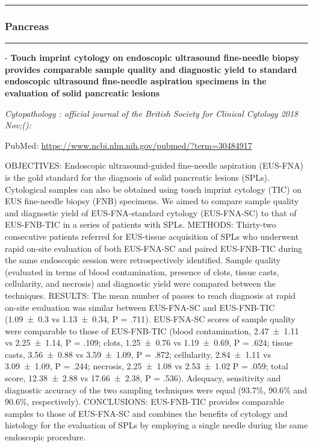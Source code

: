 \documentclass[]{article}
\begin{document}
\begin{center}\rule{0.5\linewidth}{\linethickness}\end{center}

\hypertarget{pancreas-1}{%
\subsubsection{Pancreas}\label{pancreas-1}}

\begin{center}\rule{0.5\linewidth}{\linethickness}\end{center}

 - \textbf{Touch imprint cytology on endoscopic ultrasound fine-needle
biopsy provides comparable sample quality and diagnostic yield to
standard endoscopic ultrasound fine-needle aspiration specimens in the
evaluation of solid pancreatic lesions}

\emph{Cytopathology : official journal of the British Society for
Clinical Cytology 2018 Nov;():}

PubMed: \url{https://www.ncbi.nlm.nih.gov/pubmed/?term=30484917}

OBJECTIVES: Endoscopic ultrasound-guided fine-needle aspiration
(EUS-FNA) is the gold standard for the diagnosis of solid pancreatic
lesions (SPLs). Cytological samples can also be obtained using touch
imprint cytology (TIC) on EUS fine-needle biopsy (FNB) specimens. We
aimed to compare sample quality and diagnostic yield of EUS-FNA-standard
cytology (EUS-FNA-SC) to that of EUS-FNB-TIC in a series of patients
with SPLs. METHODS: Thirty-two consecutive patients referred for
EUS-tissue acquisition of SPLs who underwent rapid on-site evaluation of
both EUS-FNA-SC and paired EUS-FNB-TIC during the same endoscopic
session were retrospectively identified. Sample quality (evaluated in
terms of blood contamination, presence of clots, tissue casts,
cellularity, and necrosis) and diagnostic yield were compared between
the techniques. RESULTS: The mean number of passes to reach diagnosis at
rapid on-site evaluation was similar between EUS-FNA-SC and EUS-FNB-TIC
(1.09~±~0.3 vs 1.13~±~0.34, P = .711). EUS-FNA-SC scores of sample
quality were comparable to those of EUS-FNB-TIC (blood contamination,
2.47~±~1.11 vs 2.25~±~1.14, P = .109; clots, 1.25~±~0.76 vs 1.19~±~0.69,
P = .624; tissue casts, 3.56~±~0.88 vs 3.59~±~1.09, P = .872;
cellularity, 2.84~±~1.11 vs 3.09~±~1.09, P = .244; necrosis, 2.25~±~1.08
vs 2.53~±~1.02 P = .059; total score, 12.38~±~2.88 vs 17.66~±~2.38, P =
.536). Adequacy, sensitivity and diagnostic accuracy of the two sampling
techniques were equal (93.7\%, 90.6\% and 90.6\%, respectively).
CONCLUSIONS: EUS-FNB-TIC provides comparable samples to those of
EUS-FNA-SC and combines the benefits of cytology and histology for the
evaluation of SPLs by employing a single needle during the same
endoscopic procedure.
\end{document}
